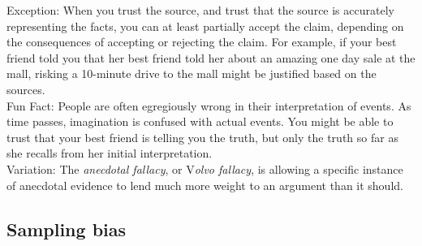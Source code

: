 \documentclass[a4paper,12pt,single,pdftex]{scrartcl}
\begin{document}
    
      Exception: When you trust the source, and trust that the source is accurately representing the facts, you can at least partially accept the claim, depending on the consequences of accepting or rejecting the claim.  For example, if your best friend told you that her best friend told her about an amazing one day sale at the mall, risking a 10-minute drive to the mall might be justified based on the sources.
    \\

    
      Fun Fact: People are often egregiously wrong in their interpretation of events.  As time passes, imagination is confused with actual events.  You might be able to trust that your best friend is telling you the truth, but only the truth so far as she recalls from her initial interpretation.
    \\

    
      Variation: The {\it anecdotal fallacy}, or V{\it olvo fallacy}, is allowing a specific instance of anecdotal evidence to lend much more weight to an argument than it should.
    \\

  \subsection{Sampling bias}
\end{document}
